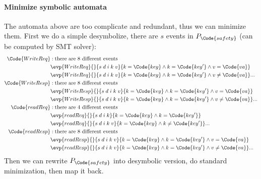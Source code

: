 \paragraph{Minimize symbolic automata} The automata above are too complicate and redundant, thus we can minimize them. First we do a simple desymbolize, there are $s$ events in $P_\Code{safety}$ (can be computed by SMT solver):
{\small\begin{align*}
\Code{WriteReq}&: \text{there are $8$ different events}
\\&\evp{WriteReq}{}{s\;d\;i\;k\;v}{k = \Code{key} \land k = \Code{key'} \land v = \Code{va}}
\\&\evp{WriteReq}{}{s\;d\;i\;k\;v}{k = \Code{key} \land k = \Code{key'} \land v \not= \Code{va}} ...
\\\Code{WriteResp}&: \text{there are $8$ different events}
\\&\evp{WriteResp}{}{s\;d\;i\;k\;v}{k = \Code{key} \land k = \Code{key'} \land v = \Code{va}}
\\&\evp{WriteResp}{}{s\;d\;i\;k\;v}{k = \Code{key} \land k = \Code{key'} \land v \not= \Code{va}} ...
\\\Code{readReq}&: \text{there are $4$ different events}
\\&\evp{readReq}{}{s\;d\;i\;k}{k = \Code{key} \land k = \Code{key'}}
\\&\evp{readReq}{}{s\;d\;i\;k\;v}{k = \Code{key} \land k \not= \Code{key'}} ...
\\\Code{readResp}&: \text{there are $8$ different events}
\\&\evp{readResp}{}{s\;d\;i\;k\;v}{k = \Code{key} \land k = \Code{key'} \land v = \Code{va}}
\\&\evp{readResp}{}{s\;d\;i\;k\;v}{k = \Code{key} \land k = \Code{key'} \land v \not= \Code{va}} ...
\end{align*}}\noindent
Then we can rewrite $P_\Code{safety}$ into desymbolic version, do standard minimization, then map it back.